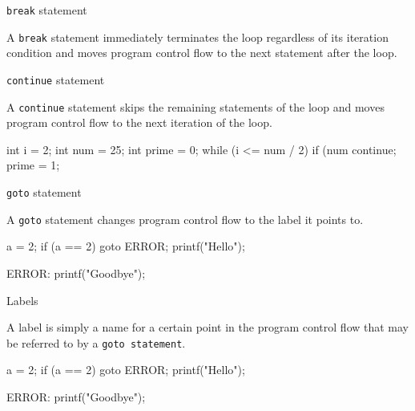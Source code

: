 \documentclass[compress]{beamer}
\begin{document}
\begin{slide}
	\begin{block}{\texttt{break} statement}

	A \texttt{break} statement immediately terminates the loop regardless of its iteration condition and moves program control flow to the next statement after the loop.


	\end{block}
\end{slide}

\begin{slide}
	\begin{block}{\texttt{continue} statement}

	A \texttt{continue} statement skips the remaining statements of the loop and moves program control flow to the next iteration of the loop.

	\begin{terminal}
	int i = 2;
	int num = 25;
	int prime = 0;
	while (i <= num / 2) {
	    if (num %
	        continue;
	    prime = 1;
	}
	\end{terminal}

	\end{block}
\end{slide}

\begin{slide}
	\begin{block}{\texttt{goto} statement}

	A \texttt{goto} statement changes program control flow to the label it points to.
	\begin{terminal}
	    a = 2;
	    if (a == 2)
	        goto ERROR;
	    printf("Hello");

	ERROR:
	    printf("Goodbye");
	\end{terminal}

	\end{block}
\end{slide}

\begin{slide}
	\begin{block}{Labels}

	A label is simply a name for a certain point in the program control flow that may be referred to by a \texttt{goto statement}.

	\begin{terminal}
	    a = 2;
	    if (a == 2)
	        goto ERROR;
	    printf("Hello");

	ERROR:
	    printf("Goodbye");
	\end{terminal}

	\end{block}
\end{slide}
\end{document}
